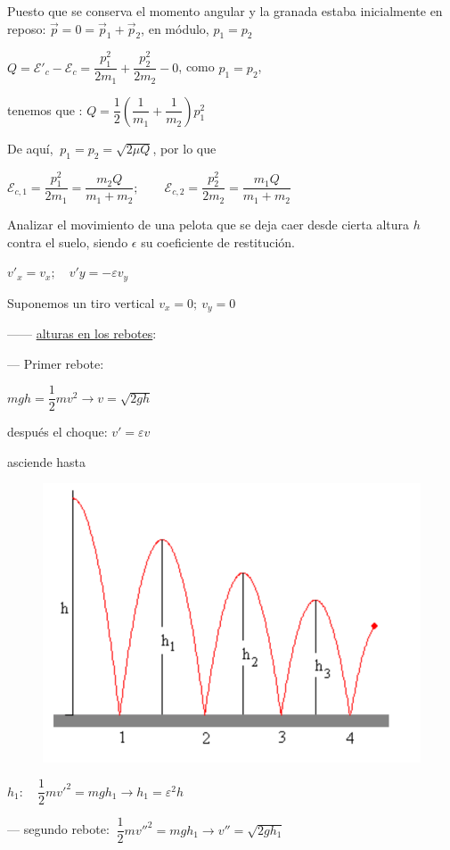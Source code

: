 Puesto que se conserva el momento angular y la granada estaba inicialmente en reposo:
$\vec p=0=\vec p_1+\vec p_2$, en módulo, $p_1=p_2$

$Q=\mathcal E'_c-\mathcal E_c=\dfrac{p_1^2}{2m_1}+\dfrac{p_2^2}{2m_2}-0$, como $p_1=p_2$, 

tenemos que : $Q=\dfrac 1 2 \left( \dfrac 1 {m_1}+\dfrac 1{m_2} \right)p_1^2$

De aquí, $\ p_1=p_2=\sqrt{2\mu Q}$, por lo que 

$\mathcal E_{c,1}=\dfrac{p_1^2}{2m_1}=\dfrac{m_2Q}{m_1+m_2}; \qquad \mathcal E_{c,2}=\dfrac{p_2^2}{2m_2}=\dfrac{m_1Q}{m_1+m_2}$


\vspace{5mm} %
\begin{prob}
Analizar el movimiento de una pelota que se deja caer desde cierta altura $h$ contra el suelo, siendo $\epsilon$ su coeficiente de restitución.	
\end{prob}

\begin{multicols}{2}
$v'_x=v_x; \quad v'y=-\varepsilon v_y$

Suponemos un tiro vertical $v_x=0; \ v_y=0$

------ \underline{alturas en los rebotes}:

--- Primer rebote:

$mgh=\dfrac 1 2 m v^2 \to v=\sqrt{2gh}$

después el choque: $v'=\varepsilon v$

asciende hasta 
\begin{figure}[H]
	\centering
	\includegraphics[width=.55\textwidth]{imagenes/imagenes17/T17IM12.png}
	\end{figure}	
\end{multicols}
$h_1: \quad \dfrac 1 2 m {v'}^2=mgh_1 \to h_1=\varepsilon^2 h$

--- segundo rebote: $\ \dfrac 1 2 m v''^2=mgh_1 \to v''=\sqrt{2gh_1}$

